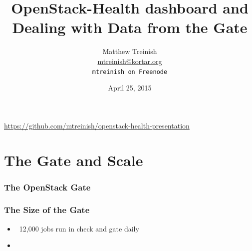 \documentclass[aspectratio=169,11pt,hyperref={colorlinks=true}]{beamer}
\author[Matthew Treinish]{%
    \texorpdfstring{%
        \centering
        Matthew Treinish\\
        \href{mailto:mtreinish@kortar.org}{mtreinish@kortar.org}\\
        \texttt{mtreinish on Freenode}
   }
   {Matthew Treinish}
}
\date{April 25, 2015}
\title[OpenStack-Health dashboard and Dealing with Data from the Gate
\hspace{2em}\insertframenumber/\inserttotalframenumber]{OpenStack-Health dashboard and Dealing with Data from the Gate}
\begin{document}
{%
\begin{frame}[noframenumbering]
    \hypersetup{colorlinks,urlcolor=white}
    \titlepage{}
    \centering
    \href{https://github.com/mtreinish/openstack-health-presentation}{https://github.com/mtreinish/openstack-health-presentation}
\end{frame}
}

\section{The Gate and Scale}
\begin{frame}
    \frametitle{The OpenStack Gate}
\end{frame}

\begin{frame}
\frametitle{The Size of the Gate}
    \begin{itemize}
        \item ~12,000 jobs run in check and gate daily
        \item 
    \end{itemize}
\end{frame}
\end{document}
